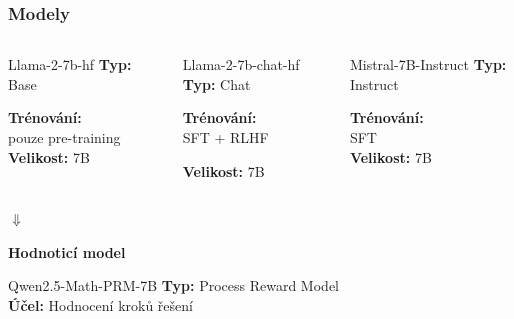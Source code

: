 \begin{frame}
\frametitle{Modely}



\begin{columns}[T]

\begin{block}{Llama-2-7b-hf}
\textbf{Typ:} Base

\textbf{Trénování:}\\
pouze pre-training
\textbf{Velikost:} 7B
\end{block}

\begin{block}{Llama-2-7b-chat-hf}
\textbf{Typ:} Chat

\textbf{Trénování:}\\
SFT + RLHF

\textbf{Velikost:} 7B
\end{block}

\begin{block}{Mistral-7B-Instruct}
\textbf{Typ:} Instruct

\textbf{Trénování:}\\
SFT \\
\textbf{Velikost:} 7B
\end{block}

\end{columns}

\vspace{0.6cm}

\centering
$\Downarrow$

\vspace{0.3cm}

\textbf{Hodnoticí model}

\vspace{0.2cm}

\begin{center}
\begin{minipage}{0.55\textwidth}
\begin{block}{Qwen2.5-Math-PRM-7B}
\textbf{Typ:} Process Reward Model \\
\textbf{Účel:} Hodnocení kroků řešení
\end{block}
\end{minipage}
\end{center}

\end{frame}

